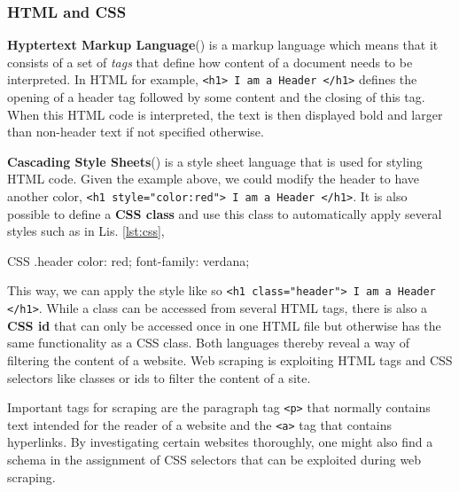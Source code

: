 \subsubsection{HTML and CSS}
  \textbf{Hyptertext Markup Language}() is a markup language which means that it consists of a set of \textsl{tags} that define how content of a document needs to be interpreted.
  In HTML for example, \texttt{<h1> I am a Header </h1>} defines the opening of a header tag followed by some content and the closing of this tag.
  When this HTML code is interpreted, the text is then displayed bold and larger than non-header text if not specified otherwise.

  \textbf{Cascading Style Sheets}() is a style sheet language that is used for styling HTML code.
  Given the example above, we could modify the header to have another color, \texttt{<h1 style="color:red">  I am a Header </h1>}.
  It is also possible to define a \textbf{CSS class} and use this class to automatically apply several styles such as in Lis. \ref{lst:css},\renewcommand{\figurename}{Listing}

  \begin{listing}[h!]
    \centering
    \begin{cminted}{CSS}
      .header {
        color: red;
        font-family: verdana;
      }
    \end{cminted}
    \caption{CSS class named \emph{header} that sets the font to verdana and color to red when used.}
    \label{lst:css}
  \end{listing}

  This way, we can apply the style like so \texttt{<h1 class="header"> I am a Header </h1>}.
  While a class can be accessed from several HTML tags, there is also a \textbf{CSS id} that can only be accessed once in one HTML file but otherwise has the same functionality as a CSS class.
  Both languages thereby reveal a way of filtering the content of a website.
  Web scraping is exploiting HTML tags and CSS selectors like classes or ids to filter the content of a site.

  Important tags for scraping are the paragraph tag \texttt{<p>} that normally contains text intended for the reader of a website and the \texttt{<a>} tag that contains hyperlinks.
  By investigating certain websites thoroughly, one might also find a schema in the assignment of CSS selectors that can be exploited during web scraping.

